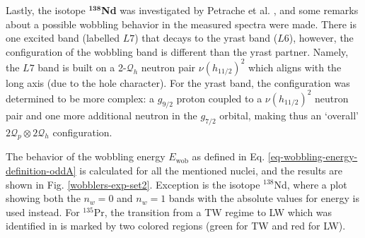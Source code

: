 Lastly, the isotope $^\mathbf{138}$\textbf{Nd} was investigated by Petrache et al. \cite{petrache2012tilted}, and some remarks about a possible wobbling behavior in the measured spectra were made. There is one excited band (labelled $L7$) that decays to the yrast band ($L6$), however, the configuration of the wobbling band is different than the yrast partner. Namely, the $L7$ band is built on a 2-$\mathcal{Q}_h$ neutron pair $\nu (h_{11/2})^2$ which aligns with the long axis (due to the hole character). For the yrast band, the configuration was determined to be more complex: a $g_{9/2}$ proton coupled to a $\nu (h_{11/2})^2$ neutron pair and one more additional neutron in the $g_{7/2}$ orbital, making thus an `overall' $2\mathcal{Q}_p\otimes2\mathcal{Q}_h$ configuration.

The behavior of the wobbling energy $E_\text{wob}$ as defined in Eq. \ref{eq-wobbling-energy-definition-oddA} is calculated for all the mentioned nuclei, and the results are shown in Fig. \ref{wobblers-exp-set2}. Exception is the isotope $^{138}$Nd, where a plot showing both the $n_w=0$ and $n_w=1$ bands with the absolute values for energy is used instead. For $^{135}$Pr, the transition from a TW regime to LW which was identified in \cite{sensharma2019two} is marked by two colored regions (green for TW and red for LW).
